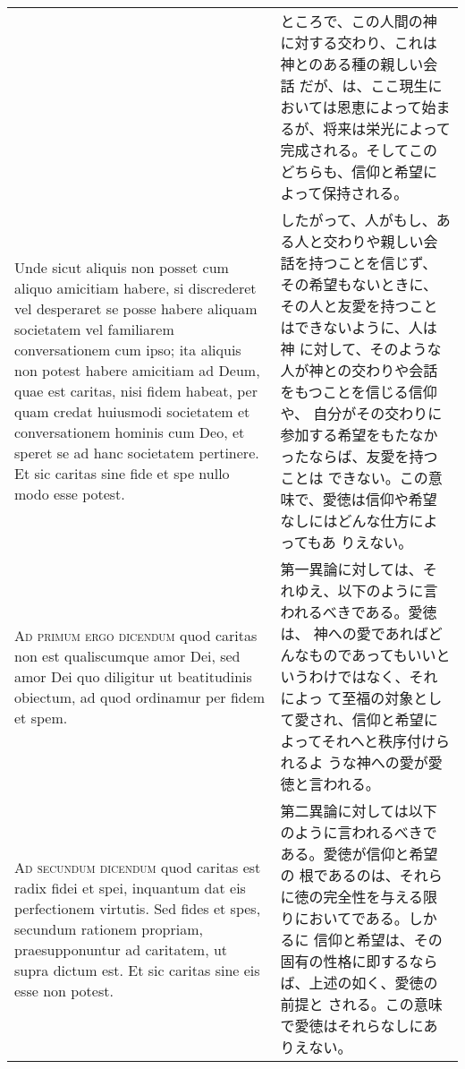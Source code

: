 \documentclass[10pt]{jsarticle}
\begin{document}
\begin{longtable}{p{21em}p{21em}}
&

 ところで、この人間の神に対する交わり、これは神とのある種の親しい会話
 だが、は、ここ現生においては恩恵によって始まるが、将来は栄光によって
 完成される。そしてこのどちらも、信仰と希望によって保持される。

\\


 Unde sicut aliquis non posset cum aliquo amicitiam habere, si
discrederet vel desperaret se posse habere aliquam societatem vel
familiarem conversationem cum ipso; ita aliquis non potest habere
amicitiam ad Deum, quae est caritas, nisi fidem habeat, per quam
credat huiusmodi societatem et conversationem hominis cum Deo, et
speret se ad hanc societatem pertinere. Et sic caritas sine fide et
spe nullo modo esse potest.

&

 したがって、人がもし、ある人と交わりや親しい会話を持つことを信じず、
 その希望もないときに、その人と友愛を持つことはできないように、人は神
 に対して、そのような人が神との交わりや会話をもつことを信じる信仰や、
 自分がその交わりに参加する希望をもたなかったならば、友愛を持つことは
 できない。この意味で、愛徳は信仰や希望なしにはどんな仕方によってもあ
 りえない。

\\




{\scshape Ad primum ergo dicendum} quod caritas non est qualiscumque
amor Dei, sed amor Dei quo diligitur ut beatitudinis obiectum, ad quod
ordinamur per fidem et spem.

&

 第一異論に対しては、それゆえ、以下のように言われるべきである。愛徳は、
 神への愛であればどんなものであってもいいというわけではなく、それによっ
 て至福の対象として愛され、信仰と希望によってそれへと秩序付けられるよ
 うな神への愛が愛徳と言われる。

\\




{\scshape Ad secundum dicendum} quod caritas est radix fidei et spei,
inquantum dat eis perfectionem virtutis. Sed fides et spes, secundum
rationem propriam, praesupponuntur ad caritatem, ut supra dictum
est. Et sic caritas sine eis esse non potest.


&

 第二異論に対しては以下のように言われるべきである。愛徳が信仰と希望の
 根であるのは、それらに徳の完全性を与える限りにおいてである。しかるに
 信仰と希望は、その固有の性格に即するならば、上述の如く、愛徳の前提と
 される。この意味で愛徳はそれらなしにありえない。


\end{longtable}
\end{document}
